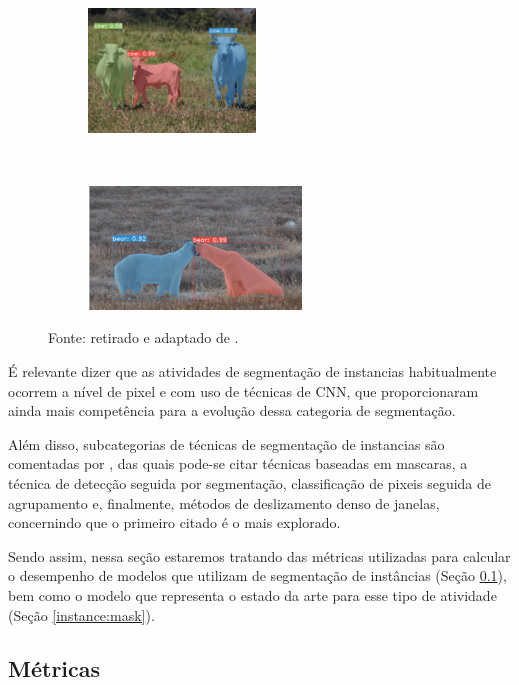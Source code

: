 \begin{figure}[H]
    \begin{subfigure}[t]{0.45\textwidth}
        \centering
        \includegraphics[height=1.3in]{recursos/imagens/instance/ins2.png}
        \label{instance:fig:4.3}
    \end{subfigure}
    ~
    \begin{subfigure}[t]{0.45\textwidth}
        \centering
        \includegraphics[height=1.3in]{recursos/imagens/instance/ins4.png}
        \label{instance:fig:4.4}
    \end{subfigure}

    \vspace*{1 cm}
    Fonte: retirado e adaptado de \cite{Bolya2019}.
\end{figure}

É relevante dizer que as atividades de segmentação de instancias habitualmente ocorrem a nível de pixel e com uso de técnicas de CNN, que proporcionaram ainda mais competência para a evolução dessa categoria de segmentação.

Além disso, subcategorias de técnicas de segmentação de instancias são comentadas por \cite{Hafiz2020}, das quais pode-se citar técnicas baseadas em mascaras, a técnica de detecção seguida por segmentação, classificação de pixeis seguida de agrupamento e, finalmente, métodos de deslizamento denso de janelas, concernindo que o primeiro citado é o mais explorado.

Sendo assim, nessa seção estaremos tratando das métricas utilizadas para calcular o desempenho de modelos que utilizam de segmentação de instâncias (Seção \ref{instance:metrics}), bem como o modelo que representa o estado da arte para esse tipo de atividade (Seção \ref{instance:mask}).


\subsection{Métricas}
\label{instance:metrics}

